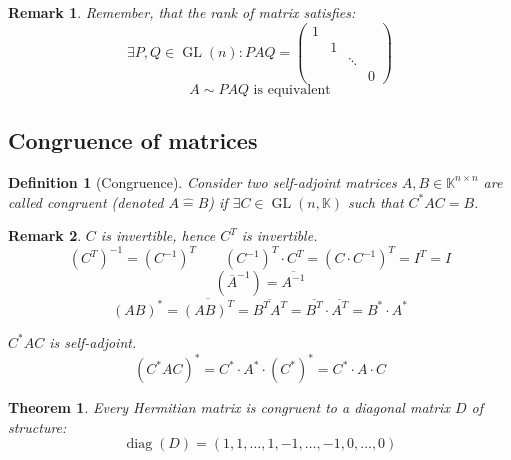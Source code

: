 \documentclass[a4paper]{article}
\newcounter{lecref}[section]
\numberwithin{lecref}{section}
\newtheorem{theorem}[lecref]{Theorem}
\newtheorem{definition}[lecref]{Definition}
\newtheorem*{Remark}{Remark}
\begin{document}
\begin{Remark}
  Remember, that the rank of matrix satisfies:
  \[ \exists P,Q \in \operatorname{GL}(n): PAQ = \begin{pmatrix} 1 & & & \\ & 1 & & \\ & & \ddots & \\ & & & 0 \end{pmatrix} \]
  \[ A \sim PAQ \text{ is equivalent} \]
\end{Remark}

\subsection{Congruence of matrices}

\begin{definition}[Congruence] %
  Consider two self-adjoint matrices $A, B \in \mathbb K^{n \times n}$ are called congruent (denoted $A \hat= B$)
  if $\exists C \in \operatorname{GL}(n, \mathbb K)$ such that $C^* AC = B$.
\end{definition}

\begin{Remark}
  $C$ is invertible, hence $C^T$ is invertible.
  \[ (C^T)^{-1} = (C^{-1})^T \qquad (C^{-1})^T \cdot C^T = (C \cdot C^{-1})^T = I^T = I \]
  \[ (\overline{A}^{-1}) = \overline{A^{-1}} \]
  \[ (AB)^* = \overline{(AB)^T} = \overline{B^T A^T} = \overline{B^T} \cdot \overline{A^T} = B^* \cdot A^* \]

  $C^* AC$ is self-adjoint.
  \[ (C^* AC)^* = C^* \cdot A^* \cdot (C^*)^* = C^* \cdot A \cdot C \]
\end{Remark}

\begin{theorem} %
  \label{thm:Herm}
  Every Hermitian matrix is congruent to a diagonal matrix $D$ of structure:
  \[ \operatorname{diag}(D) = (1, 1, \dots, 1, -1, \dots, -1, 0, \dots, 0) \]
\end{theorem}
\end{document}
